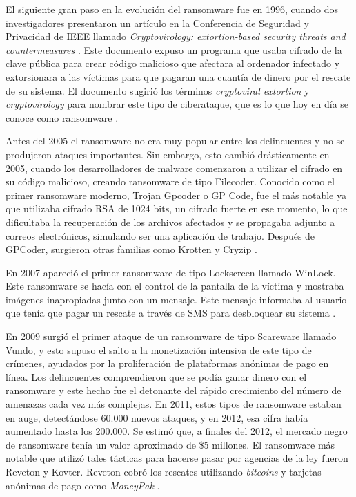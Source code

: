 El siguiente gran paso en la evolución del ransomware fue en 1996, cuando dos investigadores presentaron un artículo en la Conferencia de Seguridad y Privacidad de IEEE llamado \textit{Cryptovirology: extortion-based security threats and countermeasures} \cite{54}. Este documento expuso un programa que usaba cifrado de la clave pública para crear código malicioso que afectara al ordenador infectado y extorsionara a las víctimas para que pagaran una cuantía de dinero por el rescate de su sistema. El documento sugirió los términos \textit{cryptoviral extortion} y \textit{cryptovirology} para nombrar este tipo de ciberataque, que es lo que hoy en día se conoce como ransomware \cite{8}.


Antes del 2005 el ransomware no era muy popular entre los delincuentes y no se produjeron ataques importantes. Sin embargo, esto cambió drásticamente en 2005, cuando los desarrolladores de malware comenzaron a utilizar el cifrado en su código malicioso, creando ransomware de tipo Filecoder. Conocido como el primer ransomware moderno, Trojan Gpcoder o GP Code, fue el más notable ya que utilizaba cifrado \gls{RSA} de 1024 bits, un cifrado fuerte en ese momento, lo que dificultaba la recuperación de los archivos afectados y se propagaba adjunto a correos electrónicos, simulando ser una aplicación de trabajo. Después de GPCoder, surgieron otras familias como Krotten y Cryzip \cite{40}.


En 2007 apareció el primer ransomware de tipo Lockscreen llamado WinLock. Este ransomware se hacía con el control de la pantalla de la víctima y mostraba imágenes inapropiadas junto con un mensaje. Este mensaje informaba al usuario que tenía que pagar un rescate a través de \gls{SMS} para desbloquear su sistema \cite{56}.


En 2009 surgió el primer ataque de un ransomware de tipo Scareware llamado Vundo, y esto supuso el salto a la monetización intensiva de este tipo de crímenes, ayudados por la proliferación de plataformas anónimas de pago en línea. Los delincuentes comprendieron que se podía ganar dinero con el ransomware y este hecho fue el detonante del rápido crecimiento del número de amenazas cada vez más complejas. En 2011, estos tipos de ransomware estaban en auge, detectándose 60.000 nuevos ataques, y en 2012, esa cifra había aumentado hasta los 200.000. Se estimó que, a finales del 2012, el mercado negro de ransomware tenía un valor aproximado de \$5 millones. El ransomware más notable que utilizó tales tácticas para hacerse pasar por agencias de la ley fueron Reveton y Kovter. Reveton cobró los rescates utilizando \textit{bitcoins} y tarjetas anónimas de pago como \textit{MoneyPak} \cite{55}.

